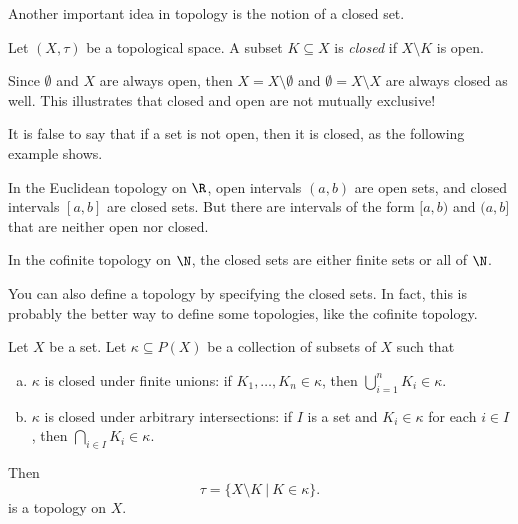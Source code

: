 \documentclass[noname]{notes}
\begin{document}
Another important idea in topology is the notion of a closed set. 

\begin{definition}
	Let $(X, \tau)$ be a topological space. A subset $K \subseteq X$ is \emph{closed} if $X \setminus K$ is open. 
\end{definition}

\begin{example}
	Since $\emptyset$ and $X$ are always open, then $X = X \setminus \emptyset$ and $\emptyset = X \setminus X$ are always closed as well. This illustrates that closed and open are not mutually exclusive! 
\end{example}

It is false to say that if a set is not open, then it is closed, as the following example shows. 

\begin{example}
	In the Euclidean topology on $\R$, open intervals $(a,b)$ are open sets, and closed intervals $[a,b]$ are closed sets. But there are intervals of the form $[a,b)$ and $(a,b]$ that are neither open nor closed. 
\end{example}

\begin{example}
	In the cofinite topology on $\N$, the closed sets are either finite sets or all of $\N$. 
\end{example}

You can also define a topology by specifying the closed sets. In fact, this is probably the better way to define some topologies, like the cofinite topology.

\begin{theorem}
	Let $X$ be a set. Let $\kappa \subseteq P(X)$ be a collection of subsets of $X$ such that 
	\begin{enumerate}[(a)]
		\item $\kappa$ is closed under finite unions: if $K_1, \ldots, K_n \in \kappa$, then $\bigcup_{i=1}^n K_i \in \kappa$. 
		\item $\kappa$ is closed under arbitrary intersections: if $I$ is a set and $K_i \in \kappa$ for each $i \in I$, then $\bigcap_{i \in I} K_i \in \kappa$. 
	\end{enumerate}
	Then
	\[
		\tau = \Big\{X \setminus K \ \Big\vert\ K \in \kappa \Big\}. 
	\]
	is a topology on $X$. 
\end{theorem}
\end{document}
